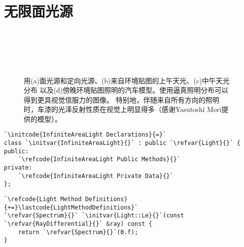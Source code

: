 \section{无限面光源}\label{sec:无限面光源}

\begin{figure}[htbp]
    \centering
    \\
    \\
    \\
    \\
    \caption{用(a)面光源和定向光源、(b)来自环境贴图的上午天光、(c)中午天光分布
    以及(d)傍晚环境贴图照明的汽车模型。使用逼真照明分布可以得到更具视觉信服力的图像。
    特别地，伴随来自所有方向的照明时，车漆的光泽反射性质在视觉上明显得多（感谢Yasutoshi Mori提供的模型）。}
    \label{fig:12.19}
\end{figure}

\begin{lstlisting}
`\initcode{InfiniteAreaLight Declarations}{=}`
class `\initvar{InfiniteAreaLight}{}` : public `\refvar{Light}{}` {
public:
    `\refcode{InfiniteAreaLight Public Methods}{}`
private:
    `\refcode{InfiniteAreaLight Private Data}{}`
};
\end{lstlisting}
\begin{lstlisting}
`\refcode{Light Method Definitions}{+=}\lastcode{LightMethodDefinitions}`
`\refvar{Spectrum}{}` `\initvar{Light::Le}{}`(const `\refvar{RayDifferential}{}` &ray) const {
    return `\refvar{Spectrum}{}`(0.f);
}
\end{lstlisting}